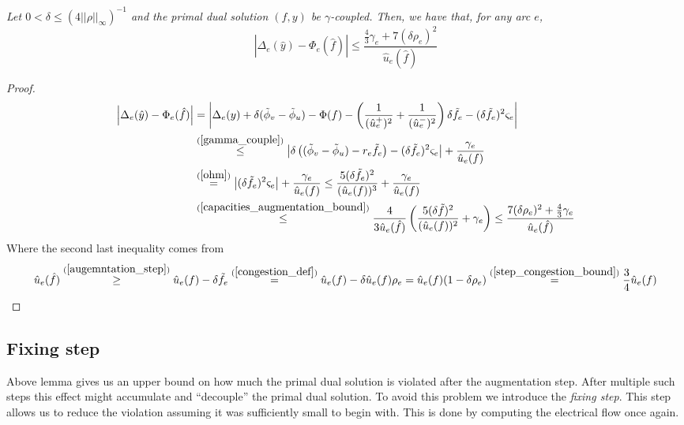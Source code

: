 \begin{lemma} \label{violation_bound}
\textit{Let $0<\delta\le(4||\rho||_\infty)^{-1}$ and the primal dual solution $(f,y)$ be $\gamma$-coupled. Then, we have that, for any arc $e$,}
\[
\left| \Delta_e(\hat y)-\Phi_e(\hat f) \right|
\le \frac{\frac{4}{3}\gamma_e+7(\delta\rho_e)^2}{\hat u_e(\hat f)} \]
\end{lemma}
\begin{proof}
\[
\begin{split}
\left|\Delta_e(\hat y)-\Phi_e(\hat f)\right|
&= \left|\Delta_e(y)+\delta(\tilde{\phi}_v-\tilde{\phi}_u)-\Phi(f)-\left(\frac{1}{(\hat u_e^+)^2}+\frac{1}{(\hat u_e^-)^2}\right)\delta\tilde  f_e-(\delta\tilde  f_e)^2\varsigma_e\right|\\
&\stackrel{(\ref{gamma_couple})}{\le} \left|\delta\left((\tilde{\phi}_v-\tilde{\phi}_u)-r_e\tilde  f_e\right)-(\delta\tilde f_e)^2\varsigma_e\right|+\frac{\gamma_e}{\hat u_e(f)}\\
&\stackrel{(\ref{ohm})}{=} \left|(\delta\tilde{f_e})^2\varsigma_e\right|+\frac{\gamma_e}{\hat u_e(f)}
\le \frac{5(\delta\tilde  f_e)^2}{(\hat u_e(f))^3}+\frac{\gamma_e}{\hat u_e(f)}\\
&\stackrel{(\ref{capacities_augmentation_bound})}{\le} \frac{4}{3\hat u_e(\hat  f)}\left(\frac{5(\delta\tilde  f)^2}{(\hat u_e(f))^2}+\gamma_e\right)
\le \frac{7(\delta\rho_e)^2+\frac{4}{3}\gamma_e}{\hat u_e(\hat f)}
\end{split}
\]
Where the second last inequality comes from
\begin{equation} \label{capacities_augmentation_bound}
\begin{split}
\hat u_e(\hat f)
\stackrel{(\ref{augemntation_step})}{\ge} \hat u_e(f)-\delta\tilde  f_e
\stackrel{(\ref{congestion_def})}{=} \hat u_e(f)-\delta\hat u_e(f)\rho_e
= \hat u_e(f)(1-\delta\rho_e)
\stackrel{(\ref{step_congestion_bound})}{=} \frac{3}{4}\hat u_e(f)
\end{split}
\end{equation}    
\end{proof}

\subsection{Fixing step}
Above lemma gives us an upper bound on how much the primal dual solution is violated after the augmentation step. After multiple such steps this effect might accumulate and ``decouple'' the primal dual solution. To avoid this problem we introduce the \textit{fixing step}. This step allows us to reduce the violation assuming it was sufficiently small to begin with. This is done by computing the electrical flow once again.

